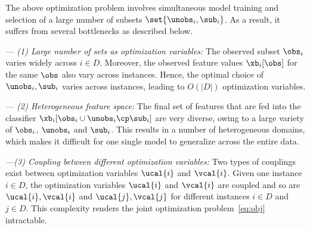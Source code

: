 \documentclass[letterpaper]{article}
\begin{document}






The above optimization problem involves simultaneous model training and selection of a large number of subsets  $\set{\unobs_i,\sub_i}$. As a result, it suffers from several bottlenecks as described below.

\noindent\emph{--- (1) Large number of sets as optimization variables:} The observed subset $\obs_i$ varies widely across $i\in D$. Moreover,  the observed feature values $\xb_i[\obs]$ for the same $\obs$ also vary across instances. Hence, the optimal choice of $\unobs_i,\sub_i$ varies across instances, leading to $O(|D|)$ optimization variables.

\noindent\emph{--- (2) Heterogeneous feature space:}
The final set of features that are fed into the classifier $\xb_i[\obs_i \cup \unobs_i\cp \sub_i]$ are very diverse, owing to a large variety of $\obs_i$, $\unobs_i$ and $\sub_i$. This results in a number of heterogeneous domains, which makes it difficult for one single model   to generalize across the entire data.

%
\noindent\emph{---(3) Coupling between different optimization variables:}
Two types of couplings exist between optimization variables $\ucal{i}$ and $\vcal{i}$. Given one instance $i\in D$, the optimization variables $\ucal{i}$ and $\vcal{i}$ are coupled and so are $\ucal{i}, \vcal{i}$ and $\ucal{j}, \vcal{j}$ for different instances $i\in D$ and $j\in D$.
This complexity renders the joint optimization problem~\eqref{eq:obj} intractable.
\end{document}
